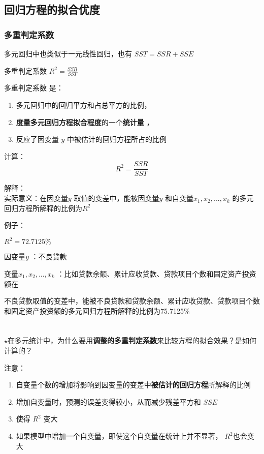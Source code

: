 \documentclass[UTF8,10pt]{book}
\begin{document}
\subsection{回归方程的拟合优度}\label{header-n171}

\subsubsection{多重判定系数 }\label{header-n172}

多元回归中也类似于一元线性回归，也有 \( SST = SSR + SSE \)

多重判定系数 \(R^2 = \frac{SSR}{SST} \)

多重判定系数 是：

\begin{enumerate}
	\def\labelenumi{\arabic{enumi}.}
	\item
	多元回归中的回归平方和占总平方的比例，
	\item
	\textbf{度量多元回归方程拟合程度}的一个\textbf{统计量} ，
	\item
	反应了因变量 \(y\) 中被估计的回归方程所占的比例
\end{enumerate}

计算：\\
\[ R^2 = \frac{SSR}{SST} \]

解释：\\
实际意义：在因变量\(y\) 取值的变差中，能被因变量\(y\)
和自变量\(x_1,x_2,...,x_k\) 的多元回归方程所解释的比例为\(R^2\)

例子：

\(R^2=72.7125\% \)

因变量\(y\) ：不良贷款

变量\(x_1,x_2,...,x_k\)
：比如贷款余额、累计应收贷款、贷款项目个数和固定资产投资额在

不良贷款取值的变差中，能被不良贷款和贷款余额、累计应收贷款、贷款项目个数和固定资产投资额的多元回归方程所解释的比例为75.7125\%
\\
\\
\\
$\star$在多元统计中，为什么要用\textbf{调整的多重判定系数}来比较方程的拟合效果？是如何计算的？

注意：
{\kaishu
\begin{enumerate}
	\def\labelenumi{\arabic{enumi}.}
	\item	自变量个数的增加将影响到因变量的变差中\textbf{被估计的回归方程}所解释的比例
	\item	增加自变量时，预测的误差变得较小，从而减少残差平方和 \(SSE\) 
	\item	使得 \(R^2\) 变大
	\item	如果模型中增加一个自变量，即使这个自变量在统计上并不显著， \(R^2\)也会变大
\end{enumerate}
}
\end{document}
